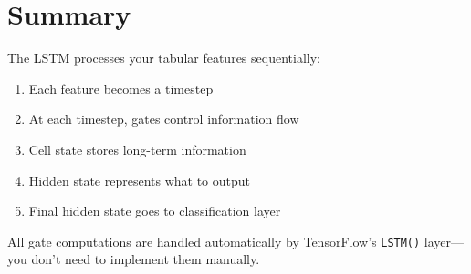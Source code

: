 \documentclass[12pt]{article}
\begin{document}
\section{Summary}

The LSTM processes your tabular features sequentially:
\begin{enumerate}
    \item Each feature becomes a timestep
    \item At each timestep, gates control information flow
    \item Cell state stores long-term information
    \item Hidden state represents what to output
    \item Final hidden state goes to classification layer
\end{enumerate}

All gate computations are handled automatically by TensorFlow's \texttt{LSTM()} layer—you don't need to implement them manually.
\end{document}
